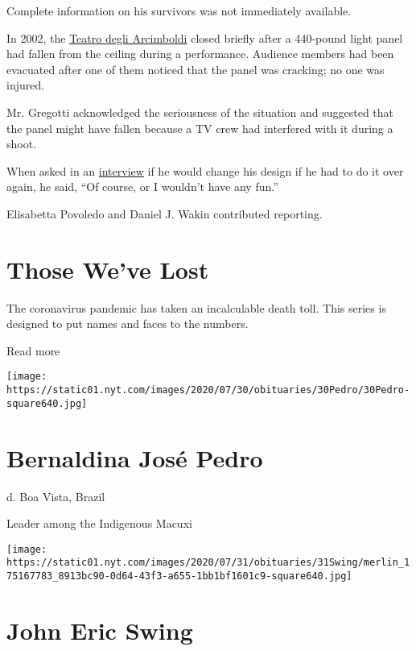 Complete information on his survivors was not immediately available.

In 2002, the \href{http://teatroarcimboldi.it/index.php}{Teatro degli
Arcimboldi} closed briefly after a 440-pound light panel had fallen from
the ceiling during a performance. Audience members had been evacuated
after one of them noticed that the panel was cracking; no one was
injured.

Mr. Gregotti acknowledged the seriousness of the situation and suggested
that the panel might have fallen because a TV crew had interfered with
it during a shoot.

When asked in an
\href{https://www.nytimes.com/2002/03/05/arts/arts-abroad-a-proud-renovation-aside-from-that-falling-glass.html}{interview}
if he would change his design if he had to do it over again, he said,
``Of course, or I wouldn't have any fun.''

Elisabetta Povoledo and Daniel J. Wakin contributed reporting.

\href{https://www.nytimes.com/interactive/2020/obituaries/people-died-coronavirus-obituaries.html?action=click\&pgtype=Article\&state=default\&region=BELOW_MAIN_CONTENT\&context=covid_obits_promo}{}

\hypertarget{those-weve-lost}{%
\section{Those We've Lost}\label{those-weve-lost}}

The coronavirus pandemic has taken an incalculable death toll. This
series is designed to put names and faces to the numbers.

Read more

\texttt{[image: https://static01.nyt.com/images/2020/07/30/obituaries/30Pedro/30Pedro-square640.jpg]}

\hypertarget{bernaldina-josuxe9-pedro}{%
\section{Bernaldina José Pedro}\label{bernaldina-josuxe9-pedro}}

d. Boa Vista, Brazil

Leader among the Indigenous Macuxi

\texttt{[image: https://static01.nyt.com/images/2020/07/31/obituaries/31Swing/merlin\_175167783\_8913bc90-0d64-43f3-a655-1bb1bf1601c9-square640.jpg]}

\hypertarget{john-eric-swing}{%
\section{John Eric Swing}\label{john-eric-swing}}

